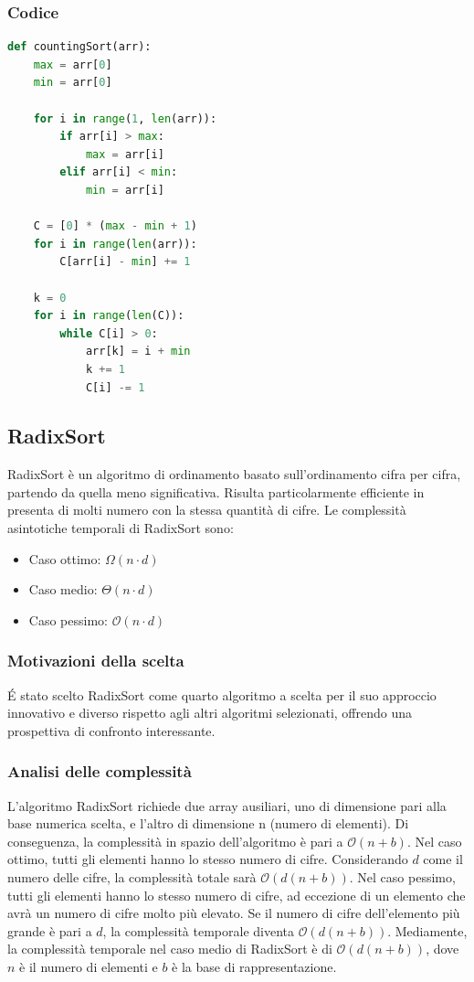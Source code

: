 \documentclass[a4paper, 11pt]{article}
\begin{document}
\subsubsection{Codice}
\begin{lstlisting}[style=mycodestyle, language=Python]
    def countingSort(arr):
    max = arr[0]
    min = arr[0]

    for i in range(1, len(arr)):
        if arr[i] > max:
            max = arr[i]
        elif arr[i] < min:
            min = arr[i]

    C = [0] * (max - min + 1)
    for i in range(len(arr)):
        C[arr[i] - min] += 1

    k = 0
    for i in range(len(C)):
        while C[i] > 0:
            arr[k] = i + min
            k += 1
            C[i] -= 1
\end{lstlisting}

\subsection{RadixSort}
RadixSort è un algoritmo di ordinamento basato sull'ordinamento cifra per cifra, partendo da quella meno significativa. Risulta particolarmente efficiente in presenta di molti numero con la stessa quantità di cifre.\bigbreak
Le complessità asintotiche temporali di RadixSort sono:
\begin{itemize}
    \item Caso ottimo: $\Omega(n\cdot d)$
    \item Caso medio: $\Theta(n\cdot d)$
    \item Caso pessimo: $\mathcal{O}(n\cdot d)$
\end{itemize}

\subsubsection{Motivazioni della scelta}
É stato scelto RadixSort come quarto algoritmo a scelta per il suo approccio innovativo e diverso rispetto agli altri algoritmi selezionati, offrendo una prospettiva di confronto interessante.

\subsubsection{Analisi delle complessità}
L'algoritmo RadixSort richiede due array ausiliari, uno di dimensione pari alla base numerica scelta, e l'altro di dimensione n (numero di elementi). Di conseguenza, la complessità in spazio dell'algoritmo è pari a $\mathcal{O}(n + b)$.\bigbreak
Nel caso ottimo, tutti gli elementi hanno lo stesso numero di cifre. Considerando $d$ come il numero delle cifre, la complessità totale sarà $\mathcal{O}(d(n + b))$.\bigbreak
Nel caso pessimo, tutti gli elementi hanno lo stesso numero di cifre, ad eccezione di un elemento che avrà un numero di cifre molto più elevato. Se il numero di cifre dell'elemento più grande è pari a $d$, la complessità temporale diventa $\mathcal{O}(d (n + b))$. Mediamente, la complessità temporale nel caso medio di RadixSort è di $\mathcal{O}(d (n + b))$, dove $n$ è il numero di elementi e $b$ è la base di rappresentazione.
\end{document}

